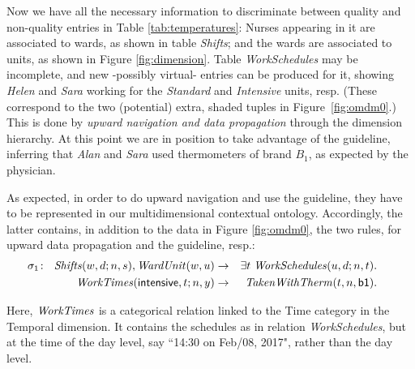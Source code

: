 \documentclass[format=acmsmall, review=false, screen=true]{acmart}
\newcommand{\ignore}[1]{}
\newcommand{\nit}[1]{{\it #1}}
\newcommand{\blue}[1]{{#1}}
\newcommand{\comlb}[1]{{\vspace{2mm}\noindent \bf \blue{COMM(LEO):}}~ #1 \hfill {\bf
    END.}\\}
\newcommand{\commos}[1]{{\vspace{2mm}\noindent \bf \blue{COMM(MOSTAFA):}}~ #1 \hfill {\bf
    END.}\\}
\begin{document}
\begin{example}
Now we have all the necessary information to discriminate between quality and non-quality entries in Table \ref{tab:temperatures}: Nurses appearing in it are associated to wards, as shown in table
{\em Shifts}; and the wards are associated to units, as shown in Figure \ref{fig:dimension}. Table {\em WorkSchedules} may be incomplete, and new -possibly virtual- entries can be produced for it, showing \nit{Helen} and \nit{Sara} working for the \nit{Standard} and \nit{Intensive} units, resp. (These correspond to the two (potential) extra, shaded  tuples in Figure~\ref{fig:omdm0}.) This is done by {\em upward navigation and data propagation} through the dimension hierarchy. At this point we are in position to take advantage of the guideline, inferring that {\it Alan} and {\it Sara} used thermometers of brand $B_1$, as expected by the physician.

\ignore{
\comlb{In Figures it would be better to use lower case for category members, as we do outside the figures.}
\commos{I applied it to the rest of the paper. I keep the letters, e.g. $H_1$ and $W_1$, as before. Let me know if you also wanted to make them small letters.}
}

As expected, in order to do upward navigation  and use the guideline, they have to be represented in our multidimensional contextual ontology. Accordingly, the latter contains,  in addition to the data in
Figure \ref{fig:omdm0}, the two rules, for upward data propagation and the guideline, resp.:
 \begin{eqnarray}
\hspace{-5mm}\sigma_1\!: \ \  \nit{Shifts}(w,d;n,s),\nit{WardUnit}(w,u) &\rightarrow& \exists t\;\nit{WorkSchedules}(u,d;n,t).\label{eq:s1intr}\\
\hspace{-3mm}\nit{WorkTimes}({\sf intensive},t;n,y) &\rightarrow& \nit{TakenWithTherm}(t,n,{\sf b1}).\label{frm:qp-intr}
\end{eqnarray}

Here, $\nit{WorkTimes}$ is a categorical relation linked to the Time category in the {\sf Temporal} dimension. It contains the schedules as in relation \nit{WorkSchedules}, but at the time of the day level, say ``14:30 on Feb/08, 2017", rather than the day level.

\ignore{
\comlb{This time vs. day issue looks a bit strange, at least here. Is it solved? Also, not a good idea to have "Time" to denote the dimension and one of its categories.}
\commos{I changed the relation name from WorkTimes to WorkTimes, and the attribute from Time to TimeOfDay to prevent confusion with the Time dimension name. If you agree, I will have to change the Time level in the figures as well.}
}


\end{example}
\end{document}
